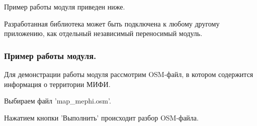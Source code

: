 \documentclass[12pt,a4paper,oneside]{article} %
\begin{document}
\begin{itemize}
\begin{figure}[h!]
\end{figure}

\end{itemize}

Пример работы модуля приведен ниже.

Разработанная библиотека может быть подключена к любому другому \linebreak
приложению, как отдельный независимый переносимый модуль.

\newpage
\subsubsection*{Пример работы модуля.}
Для демонстрации работы модуля рассмотрим OSM-файл, в котором \linebreak
содержится информация о территории МИФИ.

Выбираем файл 'map\_mephi.osm'.

\begin{figure}[h!]
\end{figure}

Нажатием кнопки 'Выполнить' происходит разбор OSM-файла.
\end{document}
